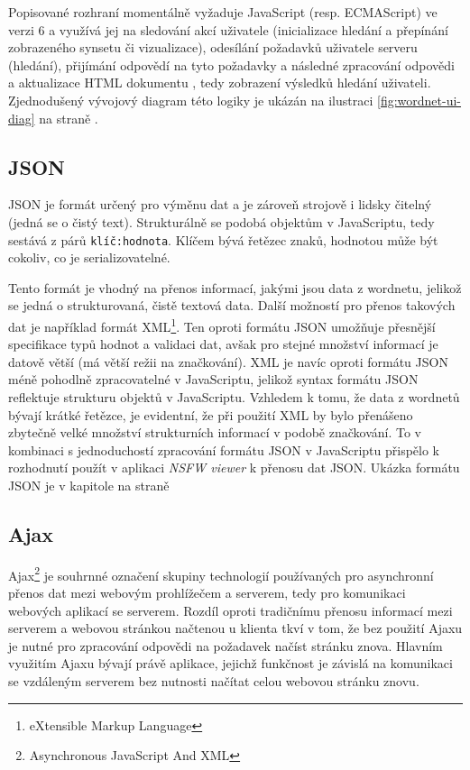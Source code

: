 \documentclass[a4paper, 11pt, oneside]{book}
\newcommand{\simplywn}{\textit{NSFW viewer} }
\newcommand{\itNameRef}[1]{\textit{\nameref{#1}}}
\begin{document}
				Popisované rozhraní momentálně vyžaduje JavaScript (resp. ECMAScript) ve verzi 6 a využívá jej na sledování akcí uživatele (inicializace hledání a přepínání zobrazeného synsetu či vizualizace), odesílání požadavků uživatele serveru (hledání), přijímání odpovědí na tyto požadavky a následné zpracování odpovědi a aktualizace HTML dokumentu%
				, tedy zobrazení výsledků hledání uživateli. %
				Zjednodušený vývojový diagram této logiky je ukázán na ilustraci \ref{fig:wordnet-ui-diag} na straně \pageref{fig:wordnet-ui-diag}.

				\subsection{JSON}
				\label{cha:json}

					JSON je formát určený pro výměnu dat a je zároveň strojově i lidsky čitelný (jedná se o čistý text). Strukturálně se podobá objektům v JavaScriptu, tedy sestává z párů \texttt{klíč:hodnota}. Klíčem bývá řetězec znaků, hodnotou může být cokoliv, co je serializovatelné. \parencite{jsonDoc}

					Tento formát je vhodný na přenos informací, jakými jsou data z wordnetu, jelikož se jedná o strukturovaná, čistě textová data. Další možností pro přenos takových dat je například formát XML\footnote{eXtensible Markup Language}. Ten oproti formátu JSON umožňuje přesnější specifikace typů hodnot a validaci dat, avšak pro stejné množství informací je datově větší (má větší režii na značkování). XML je navíc oproti formátu JSON méně pohodlně zpracovatelné v JavaScriptu, jelikož syntax formátu JSON reflektuje strukturu objektů v JavaScriptu. Vzhledem k tomu, že data z wordnetů bývají krátké řetězce, je evidentní, že při použití XML by bylo přenášeno zbytečně velké množství strukturních informací v podobě značkování. \parencite{jsonVsXML} To v kombinaci s jednoduchostí zpracování formátu JSON v JavaScriptu přispělo k rozhodnutí použít v aplikaci \simplywn k přenosu dat JSON. Ukázka formátu JSON je v kapitole \itNameRef{cha:answerStruct} na straně \pageref{cha:answerStruct}

				\subsection{Ajax}

					Ajax\footnote{Asynchronous JavaScript And XML} je souhrnné označení skupiny technologií používaných pro asynchronní přenos dat mezi webovým prohlížečem a serverem, tedy pro komunikaci webových aplikací se serverem. Rozdíl oproti tradičnímu přenosu informací mezi serverem a webovou stránkou načtenou u klienta tkví v tom, že bez použití Ajaxu je nutné pro zpracování odpovědi na požadavek načíst stránku znova. Hlavním využitím Ajaxu bývají právě aplikace, jejichž funkčnost je závislá na komunikaci se vzdáleným serverem bez nutnosti načítat celou webovou stránku znovu. \parencite{garrett2005ajax}
\end{document}
